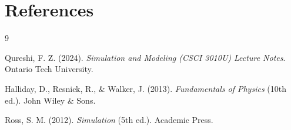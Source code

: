\documentclass[12pt, letterpaper, twoside]{article}
\begin{document}
\section{References}
\label{sec:ref}
\begin{thebibliography}{9}

Qureshi, F. Z. (2024). \textit{Simulation and Modeling (CSCI 3010U) Lecture Notes}. Ontario Tech University.

Halliday, D., Resnick, R., \& Walker, J. (2013). \textit{Fundamentals of Physics} (10th ed.). John Wiley \& Sons.

Ross, S. M. (2012). \textit{Simulation} (5th ed.). Academic Press.

\end{thebibliography}
\end{document}
